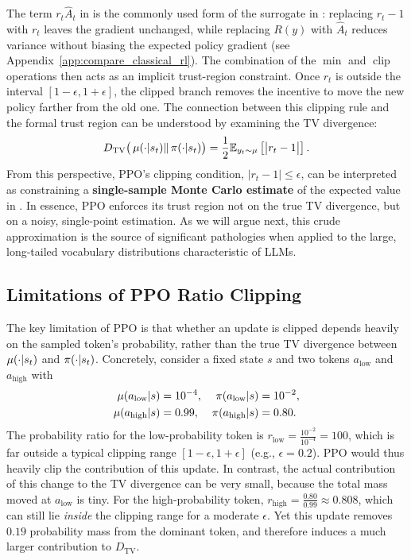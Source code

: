 The term $r_t \hat{A}_t$ in  is the commonly used form of the surrogate in : replacing $r_t - 1$ with $r_t$ leaves the gradient unchanged, while replacing $R(y)$ with $\hat{A}_t$ reduces variance without biasing the expected policy gradient (see Appendix~\ref{app:compare_classical_rl}).
The combination of the $\min$ and $\operatorname{clip}$ operations then acts as an implicit trust-region constraint. Once $r_t$ is outside the interval $[1-\epsilon, 1+\epsilon]$, the clipped branch removes the incentive to move the new policy farther from the old one.
The connection between this clipping rule and the formal trust region can be understood by examining the TV divergence:
\begin{equation}  
\label{eq:tv_as_expectation}
D_{\mathrm{TV}}\big(\operatorname*{{\textcolor{black}{\mu}}}(\cdot | s_t) \|  \operatorname*{{\textcolor{black}{\pi}}}(\cdot | s_t)\big)  =  \frac{1}{2}  \mathbb{E}_{y_t \sim \operatorname*{{\textcolor{black}{\mu}}}} \left[ \big|  r_t - 1 \big| \right].
\end{equation}
From this perspective, PPO's clipping condition, $|r_t - 1| \le \epsilon$, can be interpreted as constraining a \textbf{single-sample Monte Carlo estimate} of the expected value in .
In essence, PPO enforces its trust region not on the true TV divergence, but on a noisy, single-point estimation. As we will argue next, this crude approximation is the source of significant pathologies when applied to the large, long-tailed vocabulary distributions characteristic of LLMs.


\subsection{Limitations of PPO Ratio Clipping}  
\label{sec:method_limitations}  

The key limitation of PPO is that whether an update is clipped depends heavily on the sampled token's probability, rather than the true TV divergence between $\operatorname*{{\textcolor{black}{\mu}}}(\cdot | s_t)$ and $\operatorname*{{\textcolor{black}{\pi}}}(\cdot | s_t)$.  
Concretely, consider a fixed state $s$ and two tokens $a_{\mathrm{low}}$ and $a_{\mathrm{high}}$ with  
\begin{align*}  
\operatorname*{{\textcolor{black}{\mu}}}(a_{\mathrm{low}} | s) &= 10^{-4},  
&  
\operatorname*{{\textcolor{black}{\pi}}}(a_{\mathrm{low}} | s) &= 10^{-2},  
\\  
\operatorname*{{\textcolor{black}{\mu}}}(a_{\mathrm{high}} | s) &= 0.99,  
&  
\operatorname*{{\textcolor{black}{\pi}}}(a_{\mathrm{high}} | s) &= 0.80.  
\end{align*}  
The probability ratio for the low-probability token is  $r_{\mathrm{low}}  =  \frac{10^{-2}}{10^{-4}} = 100$, which is far outside a typical clipping range $[1-\epsilon, 1+\epsilon]$ (e.g., $\epsilon = 0.2$). PPO would thus heavily clip the contribution of this update. In contrast, the actual contribution of this change to the TV divergence can be very small, because the total mass moved at $a_{\mathrm{low}}$ is tiny.  
For the high-probability token,  $r_{\mathrm{high}}  =  \frac{0.80}{0.99} \approx 0.808$,
which can still lie \emph{inside} the clipping range for a moderate $\epsilon$. Yet this update removes $0.19$ probability mass from the dominant token, and therefore induces a much larger contribution to $D_{\mathrm{TV}}$. 

